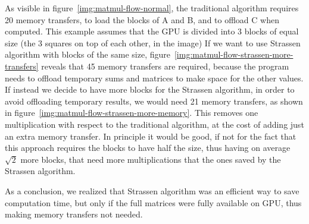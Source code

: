 As visible in figure~\ref{img:matmul-flow-normal}, the traditional algorithm requires 20 memory transfers, to load the blocks of A and B, and to offload C when computed.
This example assumes that the GPU is divided into 3 blocks of equal size (the 3 squares on top of each other, in the image)
If we want to use Strassen algorithm with blocks of the same size, figure~\ref{img:matmul-flow-strassen-more-transfers} reveals that 45 memory transfers are required, because the program needs to offload temporary sums and matrices to make space for the other values.
If instead we decide to have more blocks for the Strassen algorithm, in order to avoid offloading temporary results, we would need 21 memory transfers, as shown in figure~\ref{img:matmul-flow-strassen-more-memory}.
This removes one multiplication with respect to the traditional algorithm, at the cost of adding just an extra memory transfer.
In principle it would be good, if not for the fact that this approach requires the blocks to have half the size, thus having on average $\sqrt{2}$ more blocks, that need more multiplications that the ones saved by the Strassen algorithm.

As a conclusion, we realized that Strassen algorithm was an efficient way to save computation time, but only if the full matrices were fully available on GPU, thus making memory transfers not needed.
